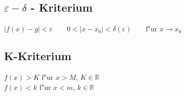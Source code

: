 \begin{flushleft}
		\subsection{$\varepsilon - \delta$ - Kriterium}
			$|f(x) - g| < \varepsilon \qquad 0 < |x - x_0| < \delta(\varepsilon) \qquad \text{f"ur } x \rightarrow x_0$
	
		\subsection{K-Kriterium}
			$f(x) > K$ f"ur $x > M$, $K \in \mathbb{R}$\\
			$f(x) < k$ f"ur $x < m$, $ k \in \mathbb{R}$

\end{flushleft}
